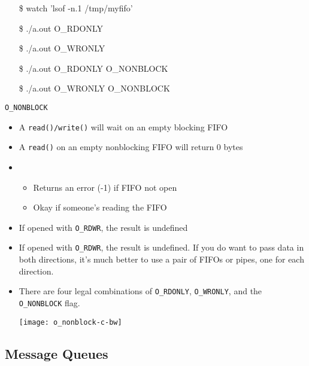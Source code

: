 \begin{frame}{}{}
  {\ttfamily
    \begin{itemize}
    \item[\$] watch 'lsof -n.1 /tmp/myfifo'
    \item[\$] ./a.out O\_RDONLY
    \item[\$] ./a.out O\_WRONLY
    \item[\$] ./a.out O\_RDONLY O\_NONBLOCK
    \item[\$] ./a.out O\_WRONLY O\_NONBLOCK
    \end{itemize}}
  \begin{block}{\texttt{O\_NONBLOCK}}
    \begin{itemize}
    \item A \texttt{read()/write()} will wait on an empty blocking FIFO
    \item A \texttt{read()} on an empty nonblocking FIFO will return 0 bytes
    \item {}
      \begin{itemize}
      \item Returns an error (-1) if FIFO not open
      \item Okay if someone's reading the FIFO
      \end{itemize}
    \item If opened with \texttt{O\_RDWR}, the result is undefined
    \end{itemize}
  \end{block}
\end{frame}

\begin{itemize}
\item If opened with \texttt{O\_RDWR}, the result is undefined. If you do want to pass
  data in both directions, it's much better to use a pair of FIFOs or pipes, one for each
  direction.
\item There are four legal combinations of \texttt{O\_RDONLY}, \texttt{O\_WRONLY}, and the
  \texttt{O\_NONBLOCK} flag. 
  \begin{center}
    \texttt{[image: o\_nonblock-c-bw]}
  \end{center}
\end{itemize}


\subsection{Message Queues}
\label{sec:message-queues}

